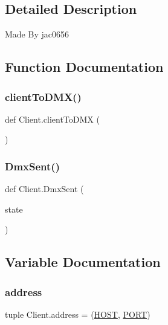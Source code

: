 \subsection{Detailed Description}
\begin{DoxyVerb}Made By jac0656
\end{DoxyVerb}
 

\subsection{Function Documentation}
\mbox{\label{namespaceClient_ad2dac70b186603f10dd58c32e44fad02}} 
\subsubsection{\texorpdfstring{client\+To\+D\+M\+X()}{clientToDMX()}}
{\footnotesize\ttfamily def Client.\+client\+To\+D\+MX (\begin{DoxyParamCaption}{ }\end{DoxyParamCaption})}

\mbox{\label{namespaceClient_ab41a4c32fbde2bd0f2824fe0e622c459}} 
\subsubsection{\texorpdfstring{Dmx\+Sent()}{DmxSent()}}
{\footnotesize\ttfamily def Client.\+Dmx\+Sent (\begin{DoxyParamCaption}\item[{}]{state }\end{DoxyParamCaption})}



\subsection{Variable Documentation}
\mbox{\label{namespaceClient_ae76026553ec6c4b09ef079364564febf}} 
\subsubsection{\texorpdfstring{address}{address}}
{\footnotesize\ttfamily tuple Client.\+address = (\hyperlink{namespaceClient_ae05d46d0136906f567ba2e59aa7d720f}{H\+O\+ST}, \hyperlink{namespaceClient_a378fa5b136bb2e7aaeb3c36410a5bbbf}{P\+O\+RT})}

